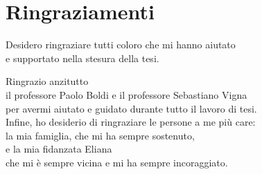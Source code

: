 \chapter*{Ringraziamenti}

\begin{flushright}

Desidero ringraziare tutti coloro che mi hanno aiutato\\ e supportato nella stesura della tesi.

Ringrazio anzitutto\\ il professore Paolo Boldi e il professore Sebastiano Vigna\\ per avermi aiutato e guidato durante tutto il lavoro di tesi.\\

Infine, ho desiderio di ringraziare le persone a me più care:\\ la mia famiglia, che mi ha sempre sostenuto,\\ e la mia fidanzata Eliana\\ che mi è sempre vicina e mi ha sempre incoraggiato.
\end{flushright}